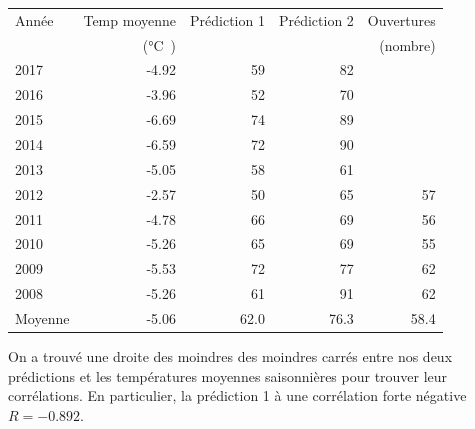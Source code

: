 \documentclass[12pt]{article}
\numberwithin{figure}{section}
\begin{document}
\begin{table}[h]
    \centering
    \begin{tabular}{|l|r|r|r|r|}\hline
        Ann\'ee &Temp moyenne &Pr\'ediction 1 &Pr\'ediction 2 &Ouvertures\\
                &(\si\celsius) & & &(nombre)\\\hline
        2017 &-4.92 &59 &82 &\\\hline
        2016 &-3.96 &52 &70 &\\\hline
        2015 &-6.69 &74 &89 &\\\hline
        2014 &-6.59 &72 &90 &\\\hline
        2013 &-5.05 &58 &61 &\\\hline
        2012 &-2.57 &50 &65 &57\\\hline
        2011 &-4.78 &66 &69 &56\\\hline
        2010 &-5.26 &65 &69 &55\\\hline
        2009 &-5.53 &72 &77 &62\\\hline
        2008 &-5.26 &61 &91 &62\\\hline
        Moyenne &-5.06 &62.0 &76.3 &58.4\\\hline
    \end{tabular}
\end{table}

On a trouv\'e une droite des moindres des moindres carr\'es entre nos deux pr\'edictions et les
temp\'eratures moyennes saisonni\`eres pour trouver leur corr\'elations. En particulier, la pr\'ediction
1 \`a une corr\'elation forte n\'egative $R = -0.892$.
\end{document}
